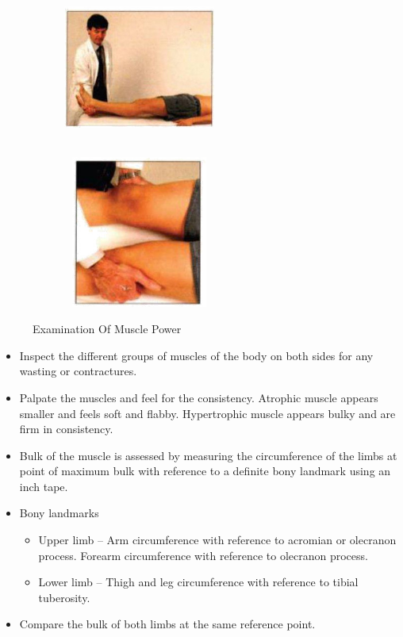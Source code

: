 \documentclass[a4paper,12pt]{book}
\begin{document}
{\begin{figure}[H]
\begin{subfigure}[t]{.25\textwidth}
		\end{subfigure}
		\hspace{\fill}
		\begin{subfigure}[t]{.25\textwidth}
			\includegraphics[width=5cm,height=5cm]{./clinicalPhysioPic/motorSystem/hipExtension.jpg}
		\end{subfigure}
		\hspace{\fill}
		\begin{subfigure}[t]{.25\textwidth}
			\includegraphics[width=5cm,height=5cm]{./clinicalPhysioPic/motorSystem/hipAbduction.jpg}
		\end{subfigure}
		\caption*{Examination Of Muscle Power}
	\end{figure}
}
\begin{itemize}
\item{Inspect the different groups of muscles of the body on both sides for any wasting or contractures.}
\item{Palpate the muscles and feel for the consistency. Atrophic muscle appears smaller and feels soft and flabby. Hypertrophic muscle appears bulky and are firm in consistency.}
\item{Bulk of the muscle is assessed by measuring the circumference of the limbs at point of maximum bulk with reference to a definite bony landmark using an inch tape.}
\item{Bony landmarks}
	\begin{itemize}
		\item[]Upper limb 	–	Arm circumference with reference to acromian or olecranon 			process. Forearm circumference with reference to olecranon 			process.
		\item[]Lower limb 	–	Thigh and leg circumference with reference to tibial 				tuberosity. 
	\end{itemize}
\item{ Compare the bulk of both limbs at the same reference point.}
\end{itemize}
\end{document}
